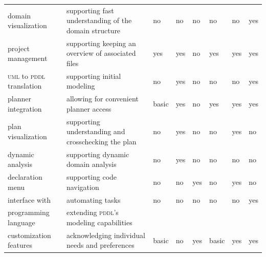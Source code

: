 \documentclass[runningheads]{llncs}
\newcommand{\pddl}{\textsc{pddl}\xspace}
\newcommand{\uml}{\textsc{uml}\xspace}
\begin{document}
\begin{table}
\begin{tabularx}{\textwidth}{lX|llllll}
  domain visualization                & supporting fast understanding of the domain structure & no                          & no                        & no                            &   no     & no      & yes       \\
  project management                  & supporting keeping an overview of associated files    & yes                         & yes                       & no                            &   yes    & yes     & yes       \\
  \uml to \pddl translation           & supporting initial modeling                           & no                          & yes                       & no                            &   no     & no      & yes       \\
  planner integration                 & allowing for convenient planner access                & basic                       & yes                       & no                            &   yes    & yes     & yes       \\
  plan visualization                  & supporting understanding and crosschecking the plan   & no                          & yes                       & no                            &   no     & yes     & no        \\
  dynamic analysis                    & supporting dynamic domain analysis                    & no                          & yes                       & no                            &   no     & no      & no        \\
  declaration menu                    & supporting code navigation                            & no                          & no                        & yes                           &   no     & yes     & no        \\
  interface with                      & automating tasks                                      & no                          & no                        & no                            &   no     & no      & yes       \\
  programming language                & extending \pddl's modeling capabilities               &                             &                           &                               &          &         &           \\
  customization features              & acknowledging individual needs and preferences        & basic                       & no                        & yes                           &  basic   & yes     & yes       \\
\end{tabularx}
\label{tab:comparison}
\end{table}
\end{document}
